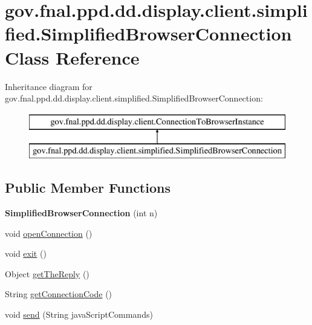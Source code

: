 \hypertarget{classgov_1_1fnal_1_1ppd_1_1dd_1_1display_1_1client_1_1simplified_1_1SimplifiedBrowserConnection}{\section{gov.\-fnal.\-ppd.\-dd.\-display.\-client.\-simplified.\-Simplified\-Browser\-Connection Class Reference}
\label{classgov_1_1fnal_1_1ppd_1_1dd_1_1display_1_1client_1_1simplified_1_1SimplifiedBrowserConnection}
}
Inheritance diagram for gov.\-fnal.\-ppd.\-dd.\-display.\-client.\-simplified.\-Simplified\-Browser\-Connection\-:\begin{figure}[H]
\begin{center}
\leavevmode
\includegraphics[height=2.000000cm]{classgov_1_1fnal_1_1ppd_1_1dd_1_1display_1_1client_1_1simplified_1_1SimplifiedBrowserConnection}
\end{center}
\end{figure}
\subsection*{Public Member Functions}
\begin{DoxyCompactItemize}
\item 
\hypertarget{classgov_1_1fnal_1_1ppd_1_1dd_1_1display_1_1client_1_1simplified_1_1SimplifiedBrowserConnection_a2116702cb839ef21aadd8b9f0bf638bd}{{\bfseries Simplified\-Browser\-Connection} (int n)}\label{classgov_1_1fnal_1_1ppd_1_1dd_1_1display_1_1client_1_1simplified_1_1SimplifiedBrowserConnection_a2116702cb839ef21aadd8b9f0bf638bd}

\item 
void \hyperlink{classgov_1_1fnal_1_1ppd_1_1dd_1_1display_1_1client_1_1simplified_1_1SimplifiedBrowserConnection_a37db2f6ae47eadc8e2a7c4152419f192}{open\-Connection} ()
\item 
void \hyperlink{classgov_1_1fnal_1_1ppd_1_1dd_1_1display_1_1client_1_1simplified_1_1SimplifiedBrowserConnection_abe5088032d49f2f6165f1323393bfc02}{exit} ()
\item 
Object \hyperlink{classgov_1_1fnal_1_1ppd_1_1dd_1_1display_1_1client_1_1simplified_1_1SimplifiedBrowserConnection_a855befa96ca62c59bfa892d2e3ab02a5}{get\-The\-Reply} ()
\item 
String \hyperlink{classgov_1_1fnal_1_1ppd_1_1dd_1_1display_1_1client_1_1simplified_1_1SimplifiedBrowserConnection_ad79f1d9224980458f61ab2fae978e622}{get\-Connection\-Code} ()
\item 
void \hyperlink{classgov_1_1fnal_1_1ppd_1_1dd_1_1display_1_1client_1_1simplified_1_1SimplifiedBrowserConnection_aa44d70781099fdc3cbe2266e55523c29}{send} (String java\-Script\-Commands)
\end{DoxyCompactItemize}
